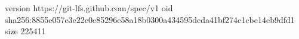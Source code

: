 version https://git-lfs.github.com/spec/v1
oid sha256:8855e057e3e22c0e85296e58a18b0300a434595dcda41bf274c1cbe14eb9dfd1
size 225411
